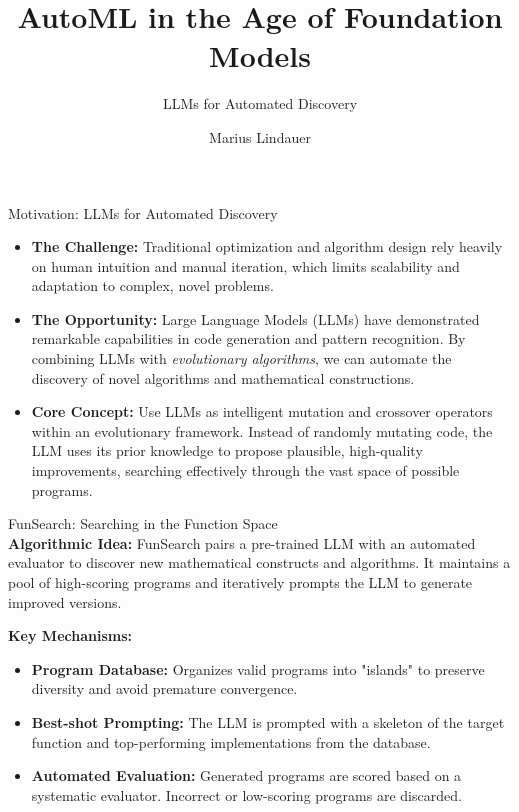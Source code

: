 \documentclass[main]{subfiles}
\title[AutoML in the Age of Foundation Models]{AutoML in the Age of Foundation Models}
\subtitle{LLMs for Automated Discovery}
\author[Marius Lindauer]{Marius Lindauer}
\date{}
\begin{document}
	
	\maketitle
	

\begin{frame}{Motivation: LLMs for Automated Discovery}
    \begin{itemize}
        \item \textbf{The Challenge:} Traditional optimization and algorithm design rely heavily on human intuition and manual iteration, which limits scalability and adaptation to complex, novel problems.
        \pause
        \item \textbf{The Opportunity:} Large Language Models (LLMs) have demonstrated remarkable capabilities in code generation and pattern recognition. By combining LLMs with \textit{evolutionary algorithms}, we can automate the discovery of novel algorithms and mathematical constructions.
        \pause
        \item \textbf{Core Concept:} Use LLMs as intelligent mutation and crossover operators within an evolutionary framework. Instead of randomly mutating code, the LLM uses its prior knowledge to propose plausible, high-quality improvements, searching effectively through the vast space of possible programs.
    \end{itemize}
    
    
\end{frame}

\begin{frame}{FunSearch: Searching in the Function Space\\ }
    \textbf{Algorithmic Idea:}
    FunSearch pairs a pre-trained LLM with an automated evaluator to discover new mathematical constructs and algorithms. It maintains a pool of high-scoring programs and iteratively prompts the LLM to generate improved versions.

    \pause
    \vspace*{0.5cm}
    \textbf{Key Mechanisms:}
    \begin{itemize}
        \item \textbf{Program Database:} Organizes valid programs into "islands" to preserve diversity and avoid premature convergence.
        \pause
        \item \textbf{Best-shot Prompting:} The LLM is prompted with a skeleton of the target function and top-performing implementations from the database.
        \pause
        \item \textbf{Automated Evaluation:} Generated programs are scored based on a systematic evaluator. Incorrect or low-scoring programs are discarded.
    \end{itemize}
    
    
\end{frame}
\end{document}
